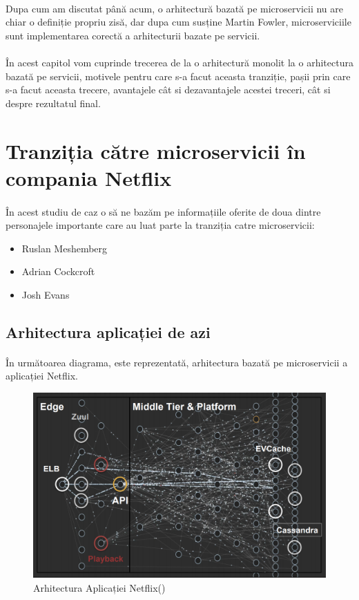 \documentclass[12pt]{report}
\begin{document}
	\paragraph{}Dupa cum am discutat până acum, o arhitectură bazată pe microservicii nu are chiar o definiție propriu zisă, dar dupa cum susține Martin Fowler, microserviciile sunt implementarea corectă a arhitecturii bazate pe servicii.
	\paragraph{}În acest capitol vom cuprinde trecerea de la o arhitectură monolit la o arhitectura bazată pe servicii, motivele pentru care s-a facut aceasta tranziție, pașii prin care s-a facut aceasta trecere, avantajele cât si dezavantajele acestei treceri, cât si despre rezultatul final.
	\section{Tranziția către microservicii în compania Netflix}
	\paragraph{}În acest studiu de caz o să ne bazăm pe informațiile oferite de doua dintre personajele importante care au luat parte la tranziția catre microservicii:
	\begin{itemize}
	\item Ruslan Meshemberg
	\item Adrian Cockcroft	
	\item Josh Evans	
	\end{itemize}
	\subsection{Arhitectura aplicației de azi}
	\paragraph{}În următoarea diagrama, este reprezentată, arhitectura bazată pe microservicii a aplicației Netflix.
	\begin{figure}[h]
  	\includegraphics[scale=.651]{netflixarhitecuture}
	\caption{Arhitectura Aplicației Netflix()}  
  	\end{figure}
\end{document}
